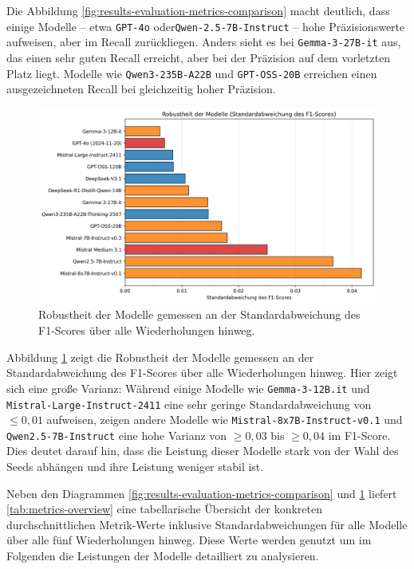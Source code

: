 Die Abbildung \ref{fig:results-evaluation-metrics-comparison} macht deutlich, dass einige Modelle – etwa \texttt{GPT-4o} oder\linebreak\texttt{Qwen-2.5-7B-Instruct} – hohe Präzisionswerte aufweisen, aber im Recall zurückliegen. Anders sieht es bei \texttt{Gemma-3-27B-it} aus, das einen sehr guten Recall erreicht, aber bei der Präzision auf dem vorletzten Platz liegt. Modelle wie \texttt{Qwen3-235B-A22B} und \texttt{GPT-OSS-20B} erreichen einen ausgezeichneten Recall bei gleichzeitig hoher Präzision.

\begin{figure}[htbp]
    \centering
    \includegraphics[width=\textwidth]{images/results/evaluation_robustness_f1_std}
    \caption{Robustheit der Modelle gemessen an der Standardabweichung des F1-Scores über alle Wiederholungen hinweg.}
    \label{fig:results-evaluation-robustness-f1-std}
\end{figure}

Abbildung \ref{fig:results-evaluation-robustness-f1-std} zeigt die Robustheit der Modelle gemessen an der Standardabweichung des F1-Scores über alle Wiederholungen hinweg. Hier zeigt sich eine große Varianz: Während einige Modelle wie \texttt{Gemma-3-12B.it} und \texttt{Mistral-Large-Instruct-2411} eine sehr geringe Standardabweichung von $\le 0{,}01$ aufweisen, zeigen andere Modelle wie \texttt{Mistral-8x7B-Instruct-v0.1} und \texttt{Qwen2.5-7B-Instruct} eine hohe Varianz von $\ge 0{,}03$ bis $\ge 0{,}04$ im F1-Score. Dies deutet darauf hin, dass die Leistung dieser Modelle stark von der Wahl des Seeds abhängen und ihre Leistung weniger stabil ist.

Neben den Diagrammen \ref{fig:results-evaluation-metrics-comparison} und \ref{fig:results-evaluation-robustness-f1-std} liefert \autoref{tab:metrics-overview} eine tabellarische
Übersicht der konkreten durchschnittlichen Metrik-Werte inklusive Standardabweichungen für alle Modelle über alle fünf Wiederholungen hinweg. Diese Werte werden genutzt um im Folgenden die Leistungen der Modelle detailliert zu analysieren.

